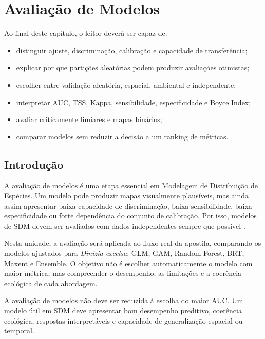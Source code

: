 \chapter[Avaliação de modelos]{Avaliação de Modelos}

\begin{objetivos}
	Ao final deste capítulo, o leitor deverá ser capaz de:
	\begin{itemize}
		\item distinguir ajuste, discriminação, calibração e capacidade de transferência;
		\item explicar por que partições aleatórias podem produzir avaliações otimistas;
		\item escolher entre validação aleatória, espacial, ambiental e independente;
		\item interpretar AUC, TSS, Kappa, sensibilidade, especificidade e Boyce Index;
		\item avaliar criticamente limiares e mapas binários;
		\item comparar modelos sem reduzir a decisão a um ranking de métricas.
	\end{itemize}
\end{objetivos}

\section{Introdução}

A avaliação de modelos é uma etapa essencial em Modelagem de Distribuição de Espécies. Um modelo pode produzir mapas visualmente plausíveis, mas ainda assim apresentar baixa capacidade de discriminação, baixa sensibilidade, baixa especificidade ou forte dependência do conjunto de calibração. Por isso, modelos de SDM devem ser avaliados com dados independentes sempre que possível \parencite{fielding1997review,allouche2006assessing,hirzel2006evaluating,li2013thresholds,guisan2017habitat}.

Nesta unidade, a avaliação será aplicada ao fluxo real da apostila, comparando os modelos ajustados para \textit{Dinizia excelsa}: GLM, GAM, Random Forest, BRT, Maxent e Ensemble. O objetivo não é escolher automaticamente o modelo com maior métrica, mas compreender o desempenho, as limitações e a coerência ecológica de cada abordagem.

\begin{conceito}[title={\faBook\quad Avaliação não é apenas ranqueamento}]
	A avaliação de modelos não deve ser reduzida à escolha do maior AUC. Um modelo útil em SDM deve apresentar bom desempenho preditivo, coerência ecológica, respostas interpretáveis e capacidade de generalização espacial ou temporal.
\end{conceito}

